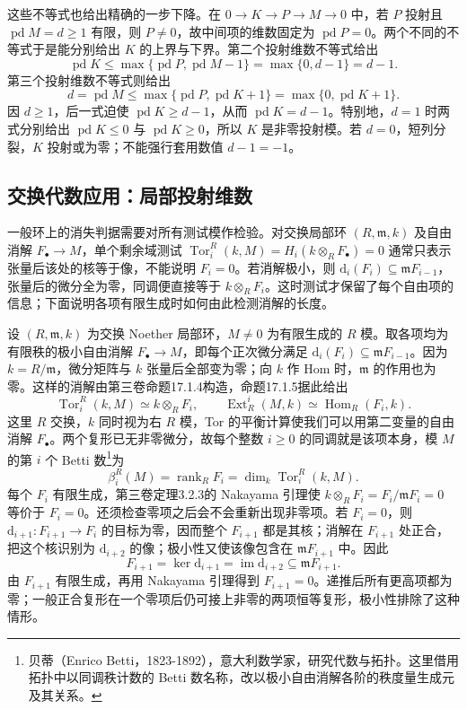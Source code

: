 这些不等式也给出精确的一步下降。在 \(0\to K\to P\to M\to0\) 中，若 \(P\) 投射且 \(\operatorname{pd}M=d\ge1\) 有限，则 \(P\ne0\)，故中间项的维数固定为 \(\operatorname{pd}P=0\)。两个不同的不等式于是能分别给出 \(K\) 的上界与下界。第二个投射维数不等式给出
\[
	\operatorname{pd}K\le\max\{\operatorname{pd}P,\operatorname{pd}M-1\} =\max\{0,d-1\}=d-1.
\]
第三个投射维数不等式则给出
\[
	d=\operatorname{pd}M\le\max\{\operatorname{pd}P,\operatorname{pd}K+1\} =\max\{0,\operatorname{pd}K+1\}.
\]
因 \(d\ge1\)，后一式迫使 \(\operatorname{pd}K\ge d-1\)，从而 \(\operatorname{pd}K=d-1\)。特别地，\(d=1\) 时两式分别给出 \(\operatorname{pd}K\le0\) 与 \(\operatorname{pd}K\ge0\)，所以 \(K\) 是非零投射模。若 \(d=0\)，短列分裂，\(K\) 投射或为零；不能强行套用数值 \(d-1=-1\)。

\subsection{交换代数应用：局部投射维数}
\label{b4:subsec:1002:03}

一般环上的消失判据需要对所有测试模作检验。对交换局部环 \((R,\mathfrak m,k)\) 及自由消解 \(F_\bullet\to M\)，单个剩余域测试 \(\operatorname{Tor}_i^R(k,M)=H_i(k\otimes_RF_\bullet)=0\) 通常只表示张量后该处的核等于像，不能说明 \(F_i=0\)。若消解极小，则 \(\mathrm{d}_i(F_i)\subseteq\mathfrak mF_{i-1}\)，张量后的微分全为零，同调便直接等于 \(k\otimes_RF_i\)。这时测试才保留了每个自由项的信息；下面说明各项有限生成时如何由此检测消解的长度。

\ProseParagraphBreak
设 \((R,\mathfrak m,k)\) 为交换 Noether 局部环，\(M\ne0\) 为有限生成的 \(R\) 模。取各项均为有限秩的极小自由消解 \(F_\bullet\to M\)，即每个正次微分满足 \(\mathrm{d}_i(F_i)\subseteq\mathfrak mF_{i-1}\)。因为 \(k=R/\mathfrak m\)，微分矩阵与 \(k\) 张量后全部变为零；向 \(k\) 作 Hom 时，\(\mathfrak m\) 的作用也为零。这样的消解由第三卷命题17.1.4构造，命题17.1.5据此给出
\[
	\operatorname{Tor}_i^R(k,M)\simeq k\otimes_R F_i,\qquad \operatorname{Ext}_R^i(M,k)\simeq\operatorname{Hom}_R(F_i,k).
\]
这里 \(R\) 交换，\(k\) 同时视为右 \(R\) 模，Tor 的平衡计算使我们可以用第二变量的自由消解 \(F_\bullet\)。两个复形已无非零微分，故每个整数 \(i\ge0\) 的同调就是该项本身，模 \(M\) 的第 \(i\) 个 Betti 数\footnote{贝蒂（Enrico Betti，1823-1892），意大利数学家，研究代数与拓扑。这里借用拓扑中以同调秩计数的 Betti 数名称，改以极小自由消解各阶的秩度量生成元及其关系。}为
\[
	\beta_i^R(M)=\operatorname{rank}_R F_i =\dim_k\operatorname{Tor}_i^R(k,M).
\]
每个 \(F_i\) 有限生成，第三卷定理3.2.3的 Nakayama 引理使 \(k\otimes_RF_i=F_i/\mathfrak mF_i=0\) 等价于 \(F_i=0\)。还须检查零项之后会不会重新出现非零项。若 \(F_i=0\)，则 \(\mathrm{d}_{i+1}:F_{i+1}\to F_i\) 的目标为零，因而整个 \(F_{i+1}\) 都是其核；消解在 \(F_{i+1}\) 处正合，把这个核识别为 \(\mathrm{d}_{i+2}\) 的像；极小性又使该像包含在 \(\mathfrak mF_{i+1}\) 中。因此
\[
	F_{i+1}=\ker\mathrm{d}_{i+1}=\operatorname{im}\mathrm{d}_{i+2} \subseteq\mathfrak mF_{i+1}.
\]
由 \(F_{i+1}\) 有限生成，再用 Nakayama 引理得到 \(F_{i+1}=0\)。递推后所有更高项都为零；一般正合复形在一个零项后仍可接上非零的两项恒等复形，极小性排除了这种情形。

